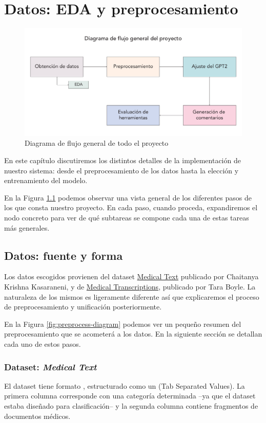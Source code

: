 \chapter{Datos: EDA y preprocesamiento}
\begin{figure}[h]
	\centering
	\includegraphics[width=.9\textwidth]{media/general-diagram.pdf}
	\caption{Diagrama de flujo general de todo el proyecto}
	\label{fig:general-diagram}
\end{figure}
En este capítulo discutiremos los distintos detalles de la implementación de nuestro sistema: desde el preprocesamiento de los datos hasta la elección y entrenamiento del modelo.

En la Figura \ref{fig:general-diagram} podemos observar una vista general de los diferentes pasos de los que consta nuestro proyecto. En cada paso, cuando proceda, expandiremos el nodo concreto para ver de qué subtareas se compone cada una de estas tareas más generales.


\section{Datos: fuente y forma}
Los datos escogidos provienen del dataset \href{https://www.kaggle.com/chaitanyakck/medical-text}{Medical Text} publicado por Chaitanya Krishna Kasaraneni, y de \href{https://www.kaggle.com/tboyle10/medicaltranscriptions}{Medical Transcriptions}, publicado por Tara Boyle. La naturaleza de los mismos es ligeramente diferente así que explicaremos el proceso de preprocesamiento y unificación posteriormente.

En la Figura \ref{fig:preprocess-diagram} podemos ver un pequeño resumen del preprocesamiento que se acometerá a los datos. En la siguiente sección se detallan cada uno de estos pasos.

\subsection{Dataset: \textit{Medical Text}}
El dataset tiene formato , estructurado como un  (Tab Separated Values). La primera columna corresponde con una categoría determinada --ya que el dataset estaba diseñado para clasificación-- y la segunda columna contiene fragmentos de documentos médicos.

